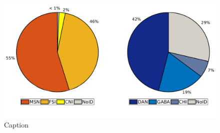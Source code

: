 \begin{figure}
  \centering
    \includegraphics[scale=0.6]{figures/PieGroup1.pdf}
   \caption{Caption}
    \label{fig:PieRegions}
\end{figure}
